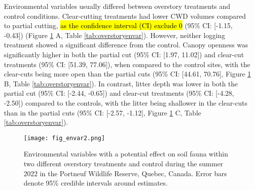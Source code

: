 Environmental variables usually differed between overstory treatments and control conditions. 
Clear-cutting treatments had lower CWD volumes compared to partial cutting, \hl{as the confidence interval (CI) exclude 0} (95\% CI: [-1.15, -0.43]) (Figure \ref{fig:envar} A, Table \ref{tab:overstoryenvar}). 
However, neither logging treatment showed a significant difference from the control. 
Canopy openness was significantly higher in both the partial cut (95\% CI: [1.97, 11.02]) and clear-cut treatments (95\% CI: [51.39, 77.06]), when compared 
to the control sites, with the clear-cuts being more open than the partial cuts (95\% CI: [44.61, 70.76], Figure \ref{fig:envar} B, Table \ref{tab:overstoryenvar}). 
In contrast, litter depth was lower in both the partial cut (95\% CI: [-2.44, -0.65]) and clear-cut treatments (95\% CI: [-4.28, -2.50]) compared to the controls, 
with the litter being shallower in the clear-cuts than in the partial cuts (95\% CI: [-2.57, -1.12], Figure \ref{fig:envar} C, Table \ref{tab:overstoryenvar}).

\vspace{10pt}

\begin{figure}[ht]
  \centering
  \texttt{[image: fig\_envar2.png]}
  \caption[Environmental variables with a potential effect on soil fauna within two different overstory treatments and control.]
  {Environmental variables with a potential effect on soil fauna within two different overstory treatments and control 
  during the summer 2022 in the Portneuf Wildlife Reserve, Quebec, Canada. Error bars denote 95\% credible intervals around estimates.}
  \label{fig:envar}
\end{figure}

